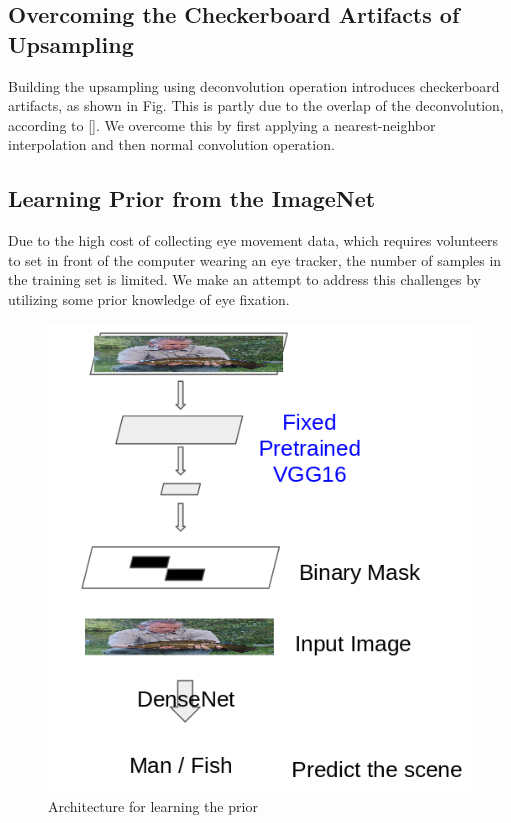 \documentclass[10pt,twocolumn,letterpaper]{article}
\begin{document}
\subsection{Overcoming the Checkerboard Artifacts of Upsampling}
Building the upsampling using deconvolution operation introduces checkerboard artifacts, as shown in Fig. This is partly due to the overlap of the deconvolution, according to []. We overcome this by first applying a nearest-neighbor interpolation and then normal convolution operation.

\subsection{Learning Prior from the ImageNet}

 Due to the high cost of collecting eye movement data, which requires volunteers to set in front of the computer wearing an eye tracker, the number of samples in the training set is limited. We make an attempt to address this challenges by utilizing some prior knowledge of eye fixation.
 
 \begin{figure}
 	\begin{center}
 		\includegraphics[width=\columnwidth]{figures/Prior.png}
 		
 	\end{center}
 	\caption{Architecture for learning the prior}
 	\label{fig:prior}
 \end{figure}
 
\end{document}
